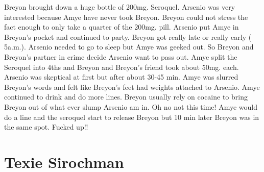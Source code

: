 \documentclass[12pt]{book}
\begin{document}
Breyon brought down a huge bottle of 200mg. Seroquel. Arsenio was very interested because Amye have never took Breyon. Breyon could not stress the fact enough to only take a quarter of the 200mg. pill. Arsenio put Amye in Breyon's pocket and continued to party. Breyon got really late or really early ( 5a.m.). Arsenio needed to go to sleep but Amye was geeked out. So Breyon and Breyon's partner in crime decide Arsenio want to pass out. Amye split the Seroquel into 4ths and Breyon and Breyon's friend took about 50mg. each. Arsenio was skeptical at first but after about 30-45 min. Amye was slurred Breyon's words and felt like Breyon's feet had weights attached to Arsenio. Amye continued to drink and do more lines. Breyon usually rely on cocaine to bring Breyon out of what ever slump Arsenio am in. Oh no not this time! Amye would do a line and the seroquel start to release Breyon but 10 min later Breyon was in the same spot. Fucked up!!



\chapter{Texie Sirochman}
\end{document}
